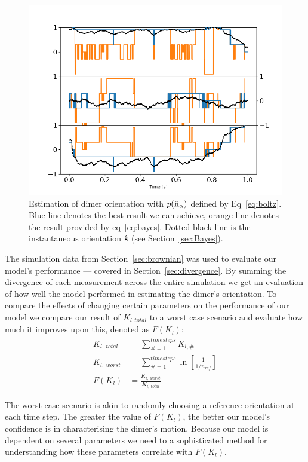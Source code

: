 \begin{figure}[h]
	\centering
	\includegraphics[width=\textwidth]{fig8a.png}
	\caption{\label{fig:biased}
		Estimation of dimer orientation with $p(\hat{\bf n}_\alpha)$ defined
		by Eq~\eqref{eq:boltz}.  Blue line denotes the best result we can
		achieve, orange line denotes the result provided by eq~\ref{eq:bayes}.
		Dotted black line is the instantaneous orientation $\hat{\bf s}$ (see Section~\ref{sec:Bayes}).
	}
\end{figure} 

The simulation data from Section~\ref{sec:brownian} was used to evaluate our model's performance --- covered in Section~\ref{sec:divergence}. By summing the divergence of each measurement across the entire simulation we get an evaluation of how well the model performed in estimating the dimer's orientation. To compare the effects of changing certain parameters on the performance of our model we compare our result of $K_{l,total}$ to a worst case scenario and evaluate how much it improves upon this, denoted as $F(K_l)$:
\begin{align}
	K_{l, \ total} &= \sum\limits_{\# =1}^{timesteps} K_{l,\#}
	\\
	K_{l, \ worst} &= \sum\limits_{\#=1}^{timesteps} \ln \left[\frac{1}{1/n_{ref}} \right]
	\\
	F(K_l) &= \frac{K_{l,\ worst}}{K_{l, \ total}}
\end{align}

The worst case scenario is akin to randomly choosing a reference
orientation at each time step. The greater the value of $F(K_l)$, the
better our model's confidence is in characterising the dimer's
motion. Because our model is dependent on several parameters we need
to a sophisticated method for understanding how these parameters
correlate with $F(K_l)$.

